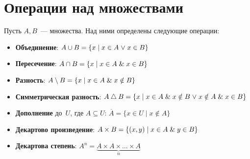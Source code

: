 \section{Операции над множествами}
Пусть $A, B$~--- множества. Над ними определены следующие операции:
\begin{itemize}
	\item \textbf{Объединение}: $A \cup B = \{ x \mid x \in A \mathrel{\lor} x \in B \}$
	\item \textbf{Пересечение}: $A \cap B = \{ x \mid x \in A \mathrel{\&} x \in B \}$
	\item \textbf{Разность}: $A \setminus B = \{ x \mid x \in A \mathrel{\&} x \notin B \}$
	\item \textbf{Симметрическая разность}: $A \bigtriangleup B = \{ x \mid x \in A \mathrel{\&} x \notin B \mathrel{\lor} x \notin A \mathrel{\&} x \in B \}$
	\item \textbf{Дополнение} до~$U$, где $A \subseteq U$: $\overline A = \{ x \in U \mid x \notin A \}$
	\item \textbf{Декартово произведение}: $A \times B = \{ (x, y) \mid x \in A \mathrel{\&} y \in B \}$
	\item \textbf{Декартова степень}: $A^n = \underbrace{A \times A \times \ldots \times A}_n$
\end{itemize}